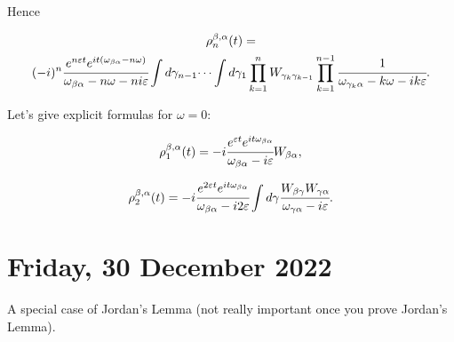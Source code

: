 \documentclass[main.tex]{subfiles}
\begin{document}
Hence

\begin{multline*}
\rho^{\beta, \alpha}_n(t) = \\(-i)^n \cfrac{e^{n\eepsilon t}e^{it(\omega_{\beta\alpha} - n\omega)}}{\omega_{\beta\alpha} - n\omega - ni\eepsilon}\int d\gamma_{n-1} \dots \int d\gamma_1 \prod_{k=1}^n W_{\gamma_k \gamma_{k - 1}} \prod_{k=1}^{n-1} \cfrac{1}{\omega_{\gamma_{k}\alpha} - k\omega -ik\eepsilon}. 
\end{multline*}

Let's give explicit formulas for $\omega = 0$:

\begin{equation}
\rho^{\beta, \alpha}_1(t) = -i \cfrac{e^{\eepsilon t}e^{it\omega_{\beta\alpha}}}{\omega_{\beta\alpha} - i\eepsilon}W_{\beta\alpha},
\end{equation}

\begin{equation}
\rho^{\beta, \alpha}_2(t) = -i \cfrac{e^{2\eepsilon t}e^{it\omega_{\beta\alpha}}}{\omega_{\beta\alpha} - i2\eepsilon}\int d \gamma \cfrac{ W_{\beta\gamma}W_{\gamma\alpha}}{\omega_{\gamma\alpha} - i\eepsilon}.
\end{equation}

\section{Friday, 30 December 2022}

A special case of Jordan's Lemma (not really important once you prove Jordan's Lemma).
\end{document}
